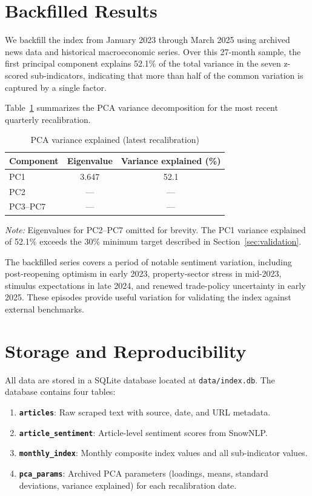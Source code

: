 \documentclass[11pt]{article}
\begin{document}
\section{Backfilled Results}\label{sec:results}

We backfill the index from January 2023 through March 2025 using
archived news data and historical macroeconomic series.  Over this
27-month sample, the first principal component explains 52.1\% of
the total variance in the seven z-scored sub-indicators, indicating
that more than half of the common variation is captured by a single
factor.

Table~\ref{tab:variance} summarizes the PCA variance decomposition
for the most recent quarterly recalibration.

\begin{table}[H]
\centering
\caption{PCA variance explained (latest recalibration)}
\label{tab:variance}
\begin{tabular}{@{}lcc@{}}
\toprule
Component & Eigenvalue & Variance explained (\%) \\
\midrule
PC1 & 3.647 & 52.1 \\
PC2 & --- & --- \\
PC3--PC7 & --- & --- \\
\bottomrule
\end{tabular}
\smallskip

\footnotesize\textit{Note:} Eigenvalues for PC2--PC7 omitted for
brevity.  The PC1 variance explained of 52.1\% exceeds the 30\%
minimum target described in Section~\ref{sec:validation}.
\end{table}

The backfilled series covers a period of notable sentiment variation,
including post-reopening optimism in early 2023, property-sector
stress in mid-2023, stimulus expectations in late 2024, and renewed
trade-policy uncertainty in early 2025.  These episodes provide useful
variation for validating the index against external benchmarks.

\section{Storage and Reproducibility}\label{sec:storage}

All data are stored in a SQLite database located at
\texttt{data/index.db}.  The database contains four tables:

\begin{enumerate}[nosep]
  \item \textbf{\texttt{articles}}: Raw scraped text with source,
    date, and URL metadata.
  \item \textbf{\texttt{article\_sentiment}}: Article-level sentiment
    scores from SnowNLP.
  \item \textbf{\texttt{monthly\_index}}: Monthly composite index
    values and all sub-indicator values.
  \item \textbf{\texttt{pca\_params}}: Archived PCA parameters
    (loadings, means, standard deviations, variance explained) for
    each recalibration date.
\end{enumerate}
\end{document}
